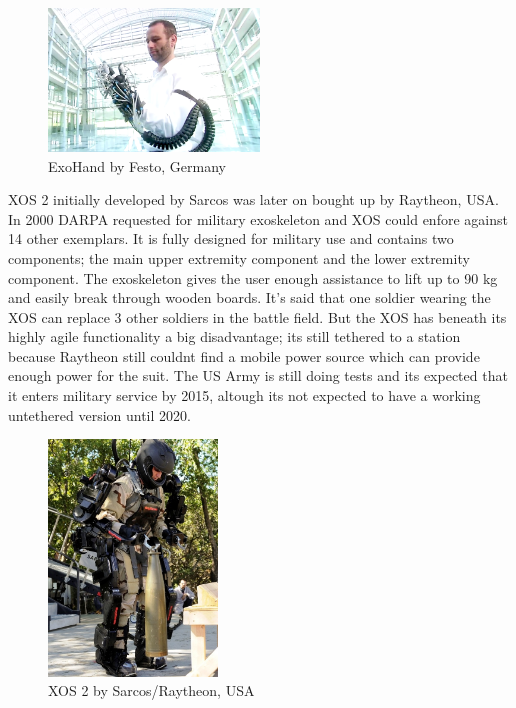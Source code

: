\documentclass[letterpaper, 10 pt, conference]{ieeeconf}  %
\begin{document}

\begin{figure}[H]
  \centering
    \includegraphics[width=0.5\textwidth]{img/exohand}
  \caption{ExoHand by Festo, Germany}
\end{figure}


XOS 2 initially developed by Sarcos was later on bought up by Raytheon, USA. In 2000 DARPA requested for military exoskeleton and XOS could enfore against 14 other exemplars. It is fully designed for military use and contains two components; the main upper extremity component and the lower extremity component. The exoskeleton gives the user enough assistance to lift up to 90 kg and easily break through wooden boards. It's said that one soldier wearing the XOS can replace 3 other soldiers in the battle field. But the XOS has beneath its highly agile functionality a big disadvantage; its still tethered to a station because Raytheon still couldnt find a mobile power source which can provide enough power for the suit. The US Army is still doing tests and its expected that it enters military service by 2015, altough its not expected to have a working untethered version until 2020.

\newpage

\begin{figure}[H]
  \centering
    \includegraphics[width=0.4\textwidth]{img/xos2}
  \caption{XOS 2 by Sarcos/Raytheon, USA}
\end{figure}
\end{document}
